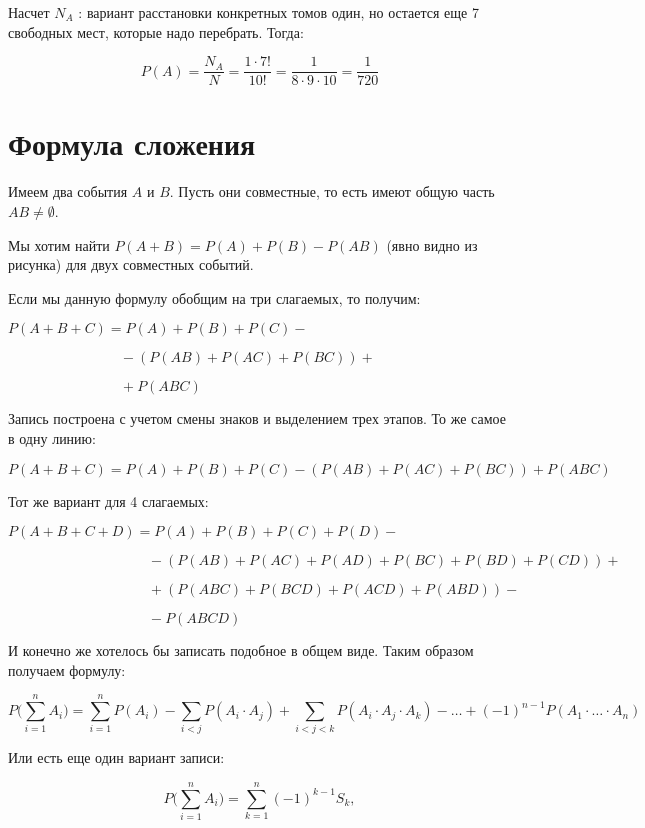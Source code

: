 \documentclass{article}
\begin{document}
Насчет $N_A$ : вариант расстановки конкретных томов один, но остается еще 7 свободных мест, которые надо перебрать. Тогда:

$$P(A) = \frac{N_A}{N} = \frac{1 \cdot 7!}{10!} = \frac{1}{8 \cdot 9 \cdot 10} = \frac{1}{720} $$

\section{Формула сложения}

Имеем два события $A$ и $B$. Пусть они совместные, то есть имеют общую часть $AB \not = \emptyset$.

Мы хотим найти $P(A + B) = P(A) + P(B) - P(AB)$ (явно видно из рисунка) для двух совместных событий.

\quad

Если мы данную формулу обобщим на три слагаемых, то получим:

$P(A + B + C) = P(A) + P(B) + P(C) - $

$\qquad\qquad\qquad\qquad- (P(AB) + P(AC) + P(BC)) + $

$\qquad\qquad\qquad\qquad+ P(ABC) $

Запись построена с учетом смены знаков и выделением трех этапов. То же самое в одну линию:

$$P(A + B + C) = P(A) + P(B) + P(C) - (P(AB) + P(AC) + P(BC)) + P(ABC) $$

\quad

Тот же вариант для 4 слагаемых:

$P(A + B + C + D) = P(A) + P(B) + P(C) + P(D) -$

$\qquad\qquad\qquad\qquad\qquad- (P(AB) + P(AC) + P(AD) + P(BC) + P(BD) + P(CD)) + $

$\qquad\qquad\qquad\qquad\qquad+ (P(ABC) + P(BCD) + P(ACD) + P(ABD)) -$

$\qquad\qquad\qquad\qquad\qquad- P(ABCD) $

\quad

И конечно же хотелось бы записать подобное в общем виде. Таким образом получаем формулу:

$$P\Biggl(\sum\limits_{i = 1}^n A_i\Biggr) = \sum\limits_{i = 1}^n P(A_i) - \sum\limits_{i < j} P(A_i \cdot A_j) + \sum\limits_{i < j < k} P(A_i \cdot A_j \cdot A_k) - \ldots + (-1)^{n - 1} P(A_1 \cdot \ldots \cdot A_n)$$

Или есть еще один вариант записи:

$$P\Biggl(\sum\limits_{i = 1}^n A_i\Biggr) = \sum\limits_{k = 1}^n (-1)^{k - 1} S_k,$$
\end{document}
